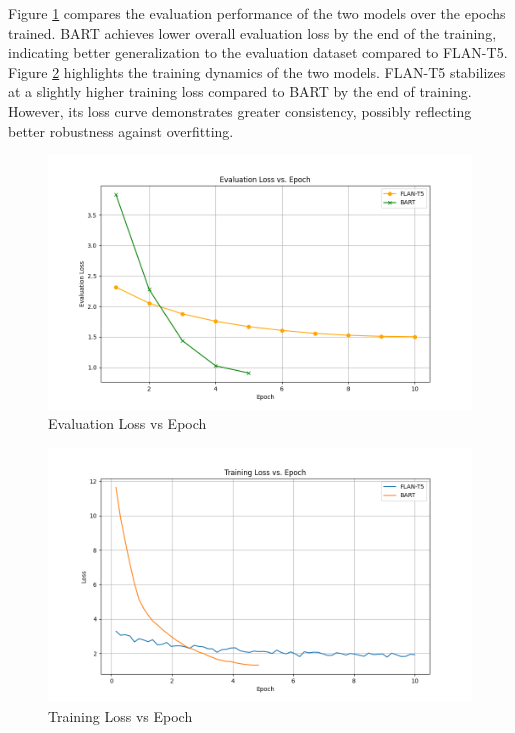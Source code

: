 \documentclass[conference]{IEEEtran}
\begin{document}
Figure \ref{fig:eval_loss} compares the evaluation performance of the two models over the epochs trained.
BART achieves lower overall evaluation loss by the end of the training, indicating better generalization to the evaluation dataset compared to FLAN-T5.
Figure \ref{fig:train_loss} highlights the training dynamics of the two models. 
FLAN-T5 stabilizes at a slightly higher training loss compared to BART by the end of training. However, its loss curve demonstrates greater consistency, possibly reflecting better robustness against overfitting.

\begin{figure}[h]
    \centering
    \includegraphics[width=\linewidth]{assets/eval_loss.png}
    \caption{Evaluation Loss vs Epoch}
    \label{fig:eval_loss}
\end{figure}

\begin{figure}[h]
    \centering
    \includegraphics[width=\linewidth]{assets/train_loss.png}
    \caption{Training Loss vs Epoch}
    \label{fig:train_loss}
\end{figure}
\end{document}
